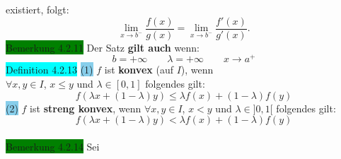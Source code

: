 \documentclass[landscape, 10pt]{article}
\begin{document}
\begin{multicols}{3}
                     existiert, folgt: 
                     \begin{equation*}
                            \lim\limits_{x\to b^{-}}
                            \frac{f(x)}{g(x)}
                            =\lim\limits_{x\to b^{-}}
                            \frac{f'(x)}{g'(x)}.
                     \end{equation*}
              \colorbox{green}{Bemerkung 4.2.11} 
                     Der Satz \textbf{gilt auch} wenn:
                     \begin{equation*}
                            b=+\infty\qquad\lambda
                            =+\infty\qquad x\to a^{+}
                     \end{equation*}
              \colorbox{cyan}{Definition 4.2.13} 
                     \colorbox{SkyBlue}{(1)} 
                            \textcolor{NavyBlue}{$f$}
                            ist \textbf{konvex} (auf 
                            \textcolor{NavyBlue}{$I$}), wenn \\
                            \textcolor{NavyBlue}{
                            $\forall x,y\in I$},
                            \textcolor{NavyBlue}{$x\leqslant y$}
                            und 
                            \textcolor{NavyBlue}{$\lambda\in[0,1]$}
                            folgendes gilt: 
                            \begin{equation*}
                                   f(\lambda x+(1-\lambda)y)
                                   \leqslant\lambda f(x)
                                   +(1-\lambda)f(y) 
                            \end{equation*}
                     \colorbox{SkyBlue}{(2)} 
                            \textcolor{NavyBlue}{$f$} ist 
                            \textbf{streng konvex}, 
                            wenn \textcolor{NavyBlue}{
                            $\forall x,y\in I$},
                            \textcolor{NavyBlue}{$x<y$}
                            und \textcolor{NavyBlue}{
                            $\lambda\in]0,1[$} 
                            folgendes gilt: 
                            \begin{equation*}
                                   f(\lambda x+(1-\lambda)y)
                                   <\lambda f(x)+(1-\lambda)f(y)
                            \end{equation*}\\
              \colorbox{green}{Bemerkung 4.2.14} 
                     Sei \textcolor{NavyBlue}{
}
\end{multicols}
\end{document}
